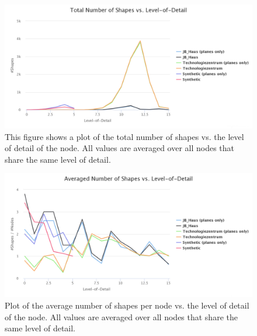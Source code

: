 \begin{figure}[h]
    \centering
    \includegraphics[width=1\textwidth]{Results/shapes_total_vs_lod.png}
    \caption[Plot of the total number of shapes vs. to the level of detail of the node]
        {This figure shows a plot of the total number of shapes vs. the level of detail of the node. All values are averaged over all nodes that share the same level of detail.}
    \label{fig:shapes_total_vs_lod}
\end{figure}

\begin{figure}[h]
    \centering
    \includegraphics[width=1\textwidth]{Results/shapes_averaged_vs_lod.png}
    \caption[Plot of the average number of shapes per node vs. the level of detail of the node]
        {Plot of the average number of shapes per node vs. the level of detail of the node. All values are averaged over all nodes that share the same level of detail.}
    \label{fig:shapes_averaged_vs_lod}
\end{figure}

